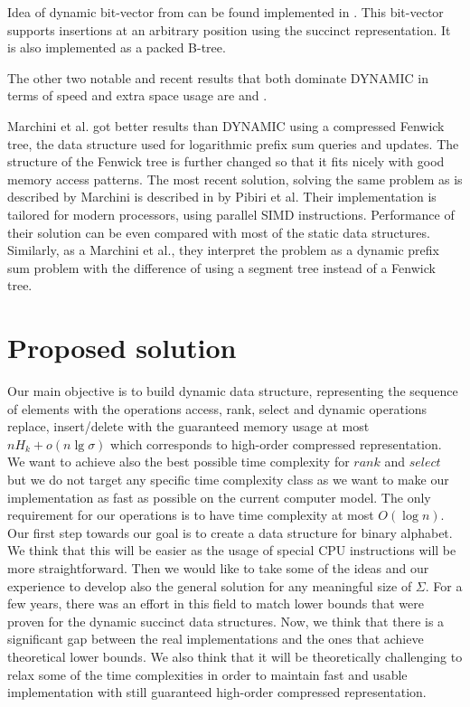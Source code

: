 Idea of dynamic bit-vector from \cite{policriti2015average} can be found implemented in \cite{ds-bitvector}. This bit-vector supports insertions at an arbitrary position using the succinct representation. It is also implemented as a packed B-tree.

The other two notable and recent results that both dominate DYNAMIC in terms of speed and extra space usage are \cite{marchini2020compact} and \cite{pibiri2020rank}.

Marchini et al. got better results than DYNAMIC using a compressed Fenwick tree\cite{marchini2020compact}, the data structure used for logarithmic prefix sum queries and updates\cite{fenwick1994new}. The structure of the Fenwick tree is further changed so that it fits nicely with good memory access patterns. The most recent solution, solving the same problem as is described by Marchini is described in \cite{pibiri2020rank} by Pibiri et al. Their implementation is tailored for modern processors, using parallel SIMD instructions. Performance of their solution can be even compared with most of the static data structures. Similarly, as a Marchini et al., they interpret the problem as a dynamic prefix sum problem with the difference of using a segment tree instead of a Fenwick tree.

\section{Proposed solution}

Our main objective is to build dynamic data structure, representing the sequence of elements with the operations access, rank, select and dynamic operations replace, insert/delete with the guaranteed memory usage at most $nH_k+o(n\lg\sigma)$ which corresponds to high-order compressed representation. We want to achieve also the best possible time complexity for $rank$ and $select$ but we do not target any specific time complexity class as we want to make our implementation as fast as possible on the current computer model. The only requirement for our operations is to have time complexity at most $O(\log n)$. Our first step towards our goal is to create a data structure for binary alphabet. We think that this will be easier as the usage of special CPU instructions will be more straightforward. Then we would like to take some of the ideas and our experience to develop also the general solution for any meaningful size of $\Sigma$. For a few years, there was an effort in this field to match lower bounds that were proven for the dynamic succinct data structures. Now, we think that there is a significant gap between the real implementations and the ones that achieve theoretical lower bounds. We also think that it will be theoretically challenging to relax some of the time complexities in order to maintain fast and usable implementation with still guaranteed high-order compressed representation.
